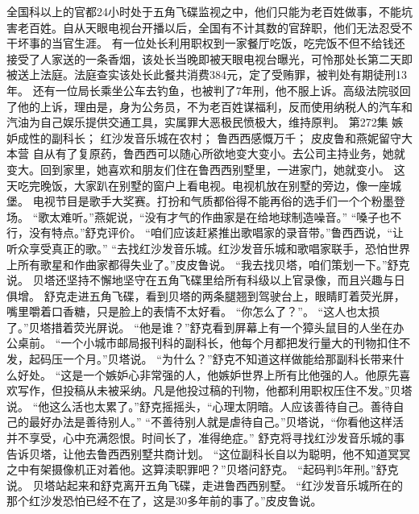 \documentclass[a4paper,12pt,UTF8,twoside]{ctexbook}
\begin{document}
        全国科以上的官都24小时处于五角飞碟监视之中，他们只能为老百姓做事，不能坑害老百姓。自从天眼电视台开播以后，全国有不计其数的官辞职，他们无法忍受不干坏事的当官生涯。  
        有一位处长利用职权到一家餐厅吃饭，吃完饭不但不给钱还接受了人家送的一条香烟，该处长当晚即被天眼电视台曝光，可怜那处长第二天即被送上法庭。法庭查实该处长此餐共消费384元，定了受贿罪，被判处有期徒刑13年。  
        还有一位局长乘坐公车去钓鱼，也被判了7年刑，他不服上诉。高级法院驳回了他的上诉，理由是，身为公务员，不为老百姓谋福利，反而使用纳税人的汽车和汽油为自己娱乐提供交通工具，实属罪大恶极民愤极大，维持原判。          第272集  
        嫉妒成性的副科长；  
        红沙发音乐城在农村；  
        鲁西西感慨万千；  
        皮皮鲁和燕妮留守大本营    
        自从有了复原药，鲁西西可以随心所欲地变大变小。去公司主持业务，她就变大。回到家里，她喜欢和朋友们住在鲁西西别墅里，一进家门，她就变小。  
        这天吃完晚饭，大家趴在别墅的窗户上看电视。电视机放在别墅的旁边，像一座城堡。  
        电视节目是歌手大奖赛。打扮和气质都俗得不能再俗的选手们一个个粉墨登场。  
        “歌太难听。”燕妮说，“没有才气的作曲家是在给地球制造噪音。”  
        “嗓子也不行，没有特点。”舒克评价。        
        “咱们应该赶紧推出歌唱家的录音带。”鲁西西说，“让听众享受真正的歌。”  
        “去找红沙发音乐城。红沙发音乐城和歌唱家联手，恐怕世界上所有歌星和作曲家都得失业了。”皮皮鲁说。  
        “我去找贝塔，咱们策划一下。”舒克说。  
        贝塔还坚持不懈地坚守在五角飞碟里给所有科级以上官录像，而且兴趣与日俱增。  
        舒克走进五角飞碟，看到贝塔的两条腿翘到驾驶台上，眼睛盯着荧光屏，嘴里嚼着口香糖，只是脸上的表情不太好看。  
        “你怎么了？”。  
        “这人也太损了。”贝塔措着荧光屏说。  
        “他是谁？”舒克看到屏幕上有一个獐头鼠目的人坐在办公桌前。  
        “一个小城市邮局报刊科的副科长，他每个月都把发行量大的刊物扣住不发，起码压一个月。”贝塔说。  
        “为什么？”舒克不知道这样做能给那副科长带来什么好处。  
        “这是一个嫉妒心非常强的人，他嫉妒世界上所有比他强的人。他原先喜欢写作，但投稿从未被采纳。凡是他投过稿的刊物，他都利用职权压住不发。”贝塔说。        
        “他这么活也太累了。”舒克摇摇头，“心理太阴暗。人应该善待自己。善待自己的最好办法是善待别人。”  
        “不善待别人就是虐待自己。”贝塔说，“你看他这样活并不享受，心中充满怨恨。时间长了，准得绝症。”  
        舒克将寻找红沙发音乐城的事告诉贝塔，让他去鲁西西别墅共商计划。  
        “这位副科长自以为聪明，他不知道冥冥之中有架摄像机正对着他。这算渎职罪吧？”贝塔问舒克。  
        “起码判5年刑。”舒克说。  
        贝塔站起来和舒克离开五角飞碟，走进鲁西西别墅。  
        “红沙发音乐城所在的那个红沙发恐怕已经不在了，这是30多年前的事了。”皮皮鲁说。  
\end{document}

